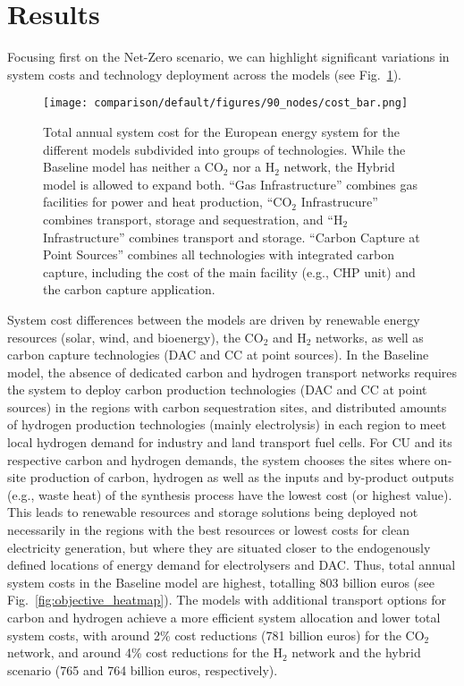 \documentclass[twocolumn]{article}
\newcommand{\carbon}{CO$_2$}
\newcommand{\hydrogen}{H$_2$}
\begin{document}
\section{Results}
\label{sec:results}


Focusing first on the Net-Zero scenario, we can highlight significant variations in system costs and technology deployment across the models (see Fig.~\ref{fig:cost_bar}).

\begin{figure}[ht!]
    \centering
    \texttt{[image: comparison/default/figures/90\_nodes/cost\_bar.png]}
    \caption[short]{Total annual system cost for the European energy system for the different models subdivided into groups of technologies. While the Baseline model has neither a \carbon{} nor a \hydrogen{} network, the Hybrid model is allowed to expand both. ``Gas Infrastructure'' combines gas facilities for power and heat production, ``\carbon{} Infrastrucure'' combines transport, storage and sequestration, and ``H$_2$ Infrastructure'' combines transport and storage. ``Carbon Capture at Point Sources'' combines all technologies with integrated carbon capture, including the cost of the main facility (e.g., CHP unit) and the carbon capture application.}
    \label{fig:cost_bar}
\end{figure}

System cost differences between the models are driven by renewable energy resources (solar, wind, and bioenergy), the \carbon{} and \hydrogen{} networks, as well as carbon capture technologies (DAC and CC at point sources).
In the Baseline model, the absence of dedicated carbon and hydrogen transport networks requires the system to deploy carbon production technologies (DAC and CC at point sources) in the regions with carbon sequestration sites, and distributed amounts of hydrogen production technologies (mainly electrolysis) in each region to meet local hydrogen demand for industry and land transport fuel cells.
For CU and its respective carbon and hydrogen demands, the system chooses the sites where on-site production of carbon, hydrogen as well as the inputs and by-product outputs (e.g., waste heat) of the synthesis process have the lowest cost (or highest value). This leads to renewable resources and storage solutions being deployed not necessarily in the regions with the best resources or lowest costs for clean electricity generation, but where they are situated closer to the endogenously defined locations of energy demand for electrolysers and DAC.
Thus, total annual system costs in the Baseline model are highest, totalling \label{}803 billion euros (see Fig.~\ref{fig:objective_heatmap}). The models with additional transport options for carbon and hydrogen achieve a more efficient system allocation and lower total system costs, with around \label{}2\% cost reductions (\label{}781 billion euros) for the \carbon{} network, and around \label{}4\% cost reductions for the \hydrogen{} network and the hybrid scenario (\label{}765 and \label{}764 billion euros, respectively).
\end{document}
